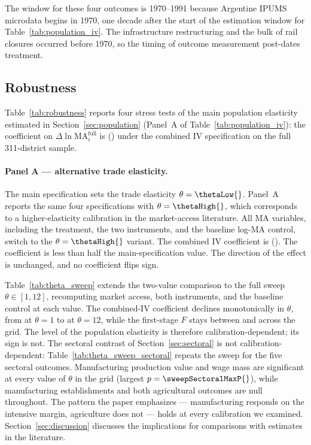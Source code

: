 The window for these four outcomes is 1970--1991 because Argentine
IPUMS microdata begins in 1970, one decade after the start of the
estimation window for Table~\ref{tab:population_iv}. The infrastructure
restructuring and the bulk of rail closures occurred before 1970, so
the timing of outcome measurement post-dates treatment.



\subsection{Robustness}
\label{sec:results_robustness}

Table~\ref{tab:robustness} reports four stress tests of the main
population elasticity estimated in
Section~\ref{sec:population} (Panel~A of
Table~\ref{tab:population_iv}): the coefficient on $\Delta \ln
\mathrm{MA}^{\mathrm{full}}_i$ is \mainPopCoefIVBoth{}
(\mainPopSEIVBoth{}) under the combined
IV specification on the full 311-district sample.

\paragraph{Panel A --- alternative trade elasticity.}
The main specification sets the trade elasticity $\theta = \thetaLow{}$.
Panel~A reports the same four specifications with $\theta = \thetaHigh{}$,
which corresponds to a higher-elasticity calibration in the
market-access literature. All MA variables, including the
treatment, the two instruments, and the baseline log-MA control,
switch to the $\theta = \thetaHigh{}$ variant. The combined IV coefficient
is \thetaHighIVBCoef{} (\thetaHighIVBSE{}). The coefficient is less than half the
main-specification value. The direction of the effect is unchanged,
and no coefficient flips sign.

Table~\ref{tab:theta_sweep} extends the two-value comparison to the
full sweep $\theta \in [1, 12]$, recomputing market access, both
instruments, and the baseline control at each value. The combined-IV
coefficient declines monotonically in $\theta$, from
\sweepBetaThetaOne{} at $\theta = 1$ to \sweepBetaThetaTwelve{} at
$\theta = 12$, while the first-stage $F$ stays between
\sweepFMin{} and \sweepFMax{} across the grid. The level of the population elasticity is
therefore calibration-dependent; its sign is not. The sectoral
contrast of Section~\ref{sec:sectoral} is not calibration-dependent:
Table~\ref{tab:theta_sweep_sectoral} repeats the sweep for the five
sectoral outcomes. Manufacturing production value and wage mass are
significant at every value of $\theta$ in the grid (largest
$p = \sweepSectoralMaxP{}$), while manufacturing establishments and both
agricultural outcomes are null throughout. The pattern the paper
emphasizes --- manufacturing responds on the intensive margin,
agriculture does not --- holds at every calibration we examined.
Section~\ref{sec:discussion} discusses the implications for
comparisons with estimates in the literature.

